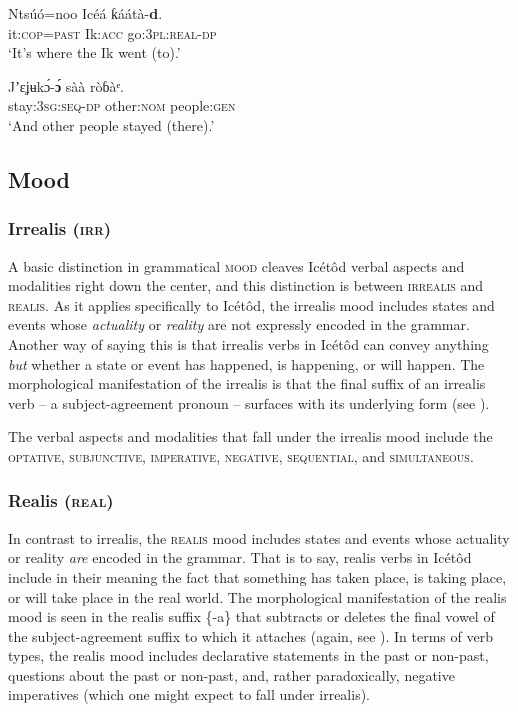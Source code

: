 \ea\label{ex:verbs:7}
\gll Ntsúó=noo     Icéá     ƙáátà-\textbf{d\ᵉ}. \\
it:\textsc{cop}=\textsc{past}    Ik:\textsc{acc}   go:\textsc{3pl:real-dp}    \\
\glt ‘It’s where the Ik went (to).’ 
\z




\ea\label{ex:verbs:8}
\gll Jʼɛʝʉk\'{ɔ}-\textbf{\'{ɔ}}     sàà     ròɓàᵉ. \\
stay:\textsc{3sg:seq-dp}   other:\textsc{nom}   people:\textsc{gen}    \\
\glt ‘And other people stayed (there).’ 
\z






\subsection{Mood}\label{sec:8.9}
\subsubsection{Irrealis (\textsc{irr})}\label{sec:8.9.1}

A basic distinction in grammatical \textsc{mood} cleaves Icétôd verbal aspects and modalities right down the center, and this distinction is between \textsc{irrealis} and \textsc{realis}. As it applies specifically to Icétôd, the irrealis mood includes states and events whose \textit{actuality} or \textit{reality} are not expressly encoded in the grammar. Another way of saying this is that irrealis verbs in Icétôd can convey anything \textit{but} whether a state or event has happened, is happening, or will happen. The morphological manifestation of the irrealis is that the final suffix of an irrealis verb – a subject-agreement pronoun – surfaces with its underlying form (see ). 

The verbal aspects and modalities that fall under the irrealis mood include the \textsc{optative}, \textsc{subjunctive}, \textsc{imperative}, \textsc{negative}, \textsc{sequential}, and \textsc{simultaneous}. 


\subsubsection{Realis (\textsc{real})}\label{sec:8.9.2}

In contrast to irrealis, the \textsc{realis} mood includes states and events whose actuality or reality \textit{are} encoded in the grammar. That is to say, realis verbs in Icétôd include in their meaning the fact that something has taken place, is taking place, or will take place in the real world. The morphological manifestation of the realis mood is seen in the realis suffix \{-a\} that subtracts or deletes the final vowel of the subject-agreement suffix to which it attaches (again, see ). In terms of verb types, the realis mood includes declarative statements in the past or non-past, questions about the past or non-past, and, rather paradoxically, negative imperatives (which one might expect to fall under irrealis).



